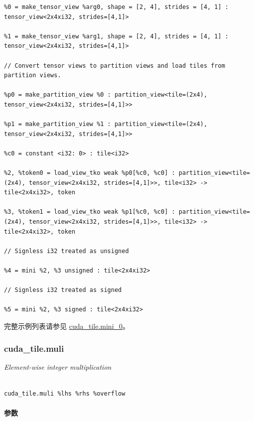 \documentclass{article}
\begin{document}
\begin{itemize}
\begin{lstlisting}
%0 = make_tensor_view %arg0, shape = [2, 4], strides = [4, 1] : tensor_view<2x4xi32, strides=[4,1]>

%1 = make_tensor_view %arg1, shape = [2, 4], strides = [4, 1] : tensor_view<2x4xi32, strides=[4,1]>

// Convert tensor views to partition views and load tiles from partition views.

%p0 = make_partition_view %0 : partition_view<tile=(2x4), tensor_view<2x4xi32, strides=[4,1]>>

%p1 = make_partition_view %1 : partition_view<tile=(2x4), tensor_view<2x4xi32, strides=[4,1]>>

%c0 = constant <i32: 0> : tile<i32>

%2, %token0 = load_view_tko weak %p0[%c0, %c0] : partition_view<tile=(2x4), tensor_view<2x4xi32, strides=[4,1]>>, tile<i32> -> tile<2x4xi32>, token

%3, %token1 = load_view_tko weak %p1[%c0, %c0] : partition_view<tile=(2x4), tensor_view<2x4xi32, strides=[4,1]>>, tile<i32> -> tile<2x4xi32>, token

// Signless i32 treated as unsigned

%4 = mini %2, %3 unsigned : tile<2x4xi32>

// Signless i32 treated as signed

%5 = mini %2, %3 signed : tile<2x4xi32>

\end{lstlisting}



\end{itemize}
完整示例列表请参见 \href{https://docs.nvidia.com/cuda/tile-ir/latest/sections/appendix.html#example-cuda-tile-mini-0}{cuda\_tile.mini\_0}。





\subsubsection{cuda\_tile.muli}


\textit{Element-wise integer multiplication}




\begin{lstlisting}

cuda_tile.muli %lhs %rhs %overflow

\end{lstlisting}



\paragraph{参数}
\end{document}
